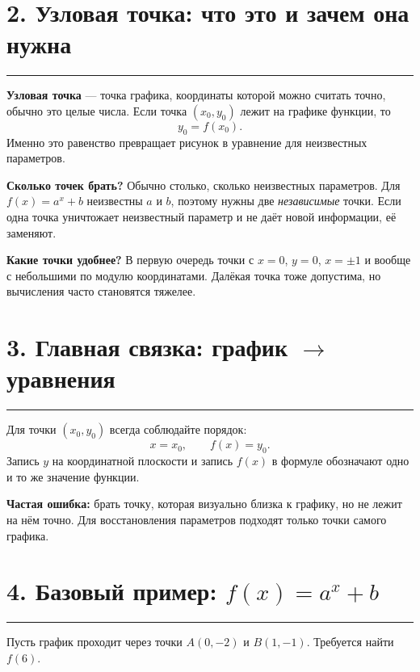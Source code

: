 \documentclass[a4paper,12pt]{article}
\newcommand{\sectionline}{\par\vspace{2pt}\noindent\color{accent}\rule{\linewidth}{0.6pt}\par\color{textgray}\vspace{4pt}}
\newcommand{\term}[1]{\textbf{\color{darkaccent}#1}}
\begin{document}
\section*{2. Узловая точка: что это и зачем она нужна}
\sectionline
\term{Узловая точка} — точка графика, координаты которой можно считать точно, обычно это целые числа. Если точка $(x_0,y_0)$ лежит на графике функции, то
\[
  y_0=f(x_0).
\]
Именно это равенство превращает рисунок в уравнение для неизвестных параметров.

\textbf{Сколько точек брать?} Обычно столько, сколько неизвестных параметров. Для $f(x)=a^x+b$ неизвестны $a$ и $b$, поэтому нужны две \emph{независимые} точки. Если одна точка уничтожает неизвестный параметр и не даёт новой информации, её заменяют.

\textbf{Какие точки удобнее?} В первую очередь точки с $x=0$, $y=0$, $x=\pm1$ и вообще с небольшими по модулю координатами. Далёкая точка тоже допустима, но вычисления часто становятся тяжелее.

\section*{3. Главная связка: график $\longrightarrow$ уравнения}
\sectionline
Для точки $(x_0,y_0)$ всегда соблюдайте порядок:
\[
  \boxed{x=x_0,\qquad f(x)=y_0.}
\]
Запись $y$ на координатной плоскости и запись $f(x)$ в формуле обозначают одно и то же значение функции.

\textbf{Частая ошибка:} брать точку, которая визуально близка к графику, но не лежит на нём точно. Для восстановления параметров подходят только точки самого графика.

\section*{4. Базовый пример: $f(x)=a^x+b$}
\sectionline
Пусть график проходит через точки $A(0,-2)$ и $B(1,-1)$. Требуется найти $f(6)$.

\begin{center}
\end{center}
\end{document}
